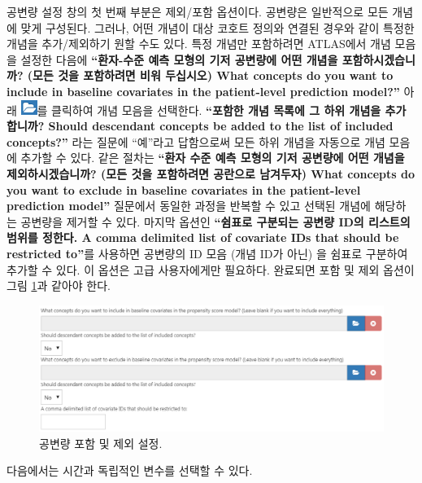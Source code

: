 \documentclass[10.5pt]{book}
\theoremstyle{definition}
\theoremstyle{definition}
\theoremstyle{definition}
\theoremstyle{remark}
\begin{document}
공변량 설정 창의 첫 번째 부분은 제외/포함 옵션이다. 공변량은 일반적으로
모든 개념에 맞게 구성된다. 그러나, 어떤 개념이 대상 코호트 정의와 연결된
경우와 같이 특정한 개념을 추가/제외하기 원할 수도 있다. 특정 개념만
포함하려면 ATLAS에서 개념 모음을 설정한 다음에 \textbf{``환자-수준 예측
모형의 기저 공변량에 어떤 개념을 포함하시겠습니까? (모든 것을 포함하려면
비워 두십시오) What concepts do you want to include in baseline
covariates in the patient-level prediction model?''} 아래
\includegraphics{images/PopulationLevelEstimation/open.png}를 클릭하여
개념 모음을 선택한다. \textbf{``포함한 개념 목록에 그 하위 개념을
추가합니까? Should descendant concepts be added to the list of included
concepts?''} 라는 질문에 ``예''라고 답함으로써 모든 하위 개념을 자동으로
개념 모음에 추가할 수 있다. 같은 절차는 \textbf{``환자 수준 예측 모형의
기저 공변량에 어떤 개념을 제외하시겠습니까? (모든 것을 포함하려면
공란으로 남겨두자) What concepts do you want to exclude in baseline
covariates in the patient-level prediction model''} 질문에서 동일한
과정을 반복할 수 있고 선택된 개념에 해당하는 공변량을 제거할 수 있다.
마지막 옵션인 \textbf{``쉼표로 구분되는 공변량 ID의 리스트의 범위를
정한다. A comma delimited list of covariate IDs that should be
restricted to''}를 사용하면 공변량의 ID 모음 (개념 ID가 아닌) 을 쉼표로
구분하여 추가할 수 있다. 이 옵션은 고급 사용자에게만 필요하다. 완료되면
포함 및 제외 옵션이 그림 \ref{fig:covariateSettings1}과 같아야 한다.

\begin{figure}

{\centering \includegraphics[width=1\linewidth]{images/PatientLevelPrediction/covariateSettings1} 

}

\caption{공변량 포함 및 제외 설정.}\label{fig:covariateSettings1}
\end{figure}

다음에서는 시간과 독립적인 변수를 선택할 수 있다.
\end{document}
